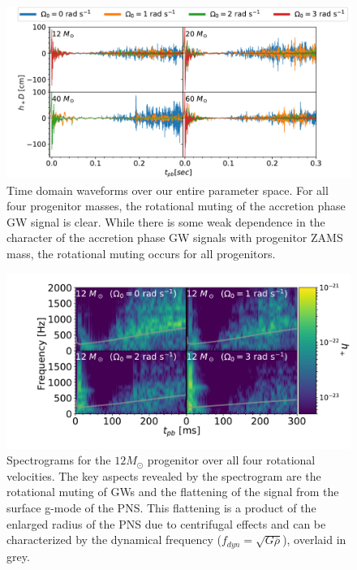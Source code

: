 \documentclass[twocolumn,times]{aastex62}  %
\begin{document}
\begin{figure}[t]
\includegraphics[width=\textwidth]{figures/ccsn2D_M1_all.pdf}
\centering
\caption{Time domain waveforms over our entire parameter space.  For all four progenitor masses, the rotational muting of the accretion phase GW signal is clear.  While there is some weak dependence in the character of the accretion phase GW signals with progenitor ZAMS mass, the rotational muting occurs for all progenitors.}
\label{fig:ccsn_all}
\end{figure}

\begin{figure}[t]
    \centering
    \includegraphics[trim=80 0 0 0, scale=0.38]{figures/gws_2x2_line_test_size.pdf}
    \caption{Spectrograms for the $12 M_\odot$ progenitor over all four rotational velocities.  The key aspects revealed by the spectrogram are the rotational muting of GWs and the flattening of the signal from the surface g-mode of the PNS.  This flattening is a product of the enlarged radius of the PNS due to centrifugal effects and can be characterized by the dynamical frequency ($f_{dyn} = \sqrt{G \overline{\rho}}$), overlaid in grey.}
    \label{fig:2x2}
\end{figure}
\end{document}
